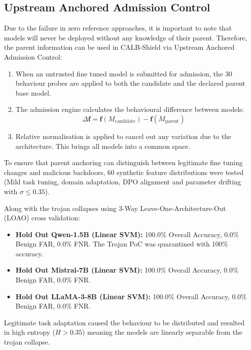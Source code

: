 \subsection{Upstream Anchored Admission Control}
\label{subsec:rq1_upstream}
Due to the failure in zero reference approaches, it is important to note that models will never be deployed without any knowledge of their parent. Therefore, the parent information can be used in CALB-Shield via Upstream Anchored Admission Control:
\begin{enumerate}
    \item When an untrusted fine tuned model is submitted for admission, the 30 behaviour probes are applied to both the candidate and the declared parent base model.
    \item The admission engine calculates the behavioural difference between models:
    \begin{equation}
    \Delta \mathbf{f} = \mathbf{f}(M_{\text{candidate}}) - \mathbf{f}(M_{\text{parent}})
    \end{equation}
    \item Relative normalisation is applied to cancel out any variation due to the architecture. This brings all models into a common space.
\end{enumerate}

To ensure that parent anchoring can distinguish between legitimate fine tuning changes and malicious backdoors, 60 synthetic feature distributions were tested (Mild task tuning, domain adaptation, DPO alignment and parameter drifting with $\sigma \le 0.35$).

Along with the trojan collapses using 3-Way Leave-One-Architecture-Out (LOAO) cross validation:
\begin{itemize}
    \item \textbf{Hold Out Qwen-1.5B (Linear SVM):} 100.0\% Overall Accuracy, 0.0\% Benign FAR, 0.0\% FNR. The Trojan PoC was quarantined with 100\% accuracy.
    \item \textbf{Hold Out Mistral-7B (Linear SVM):} 100.0\% Overall Accuracy, 0.0\% Benign FAR, 0.0\% FNR.
    \item \textbf{Hold Out LLaMA-3-8B (Linear SVM):} 100.0\% Overall Accuracy, 0.0\% Benign FAR, 0.0\% FNR.
\end{itemize}
Legitimate task adaptation caused the behaviour to be distributed and resulted in high entropy ($H > 0.35$) meaning the models are linearly separable from the trojan collapse.
